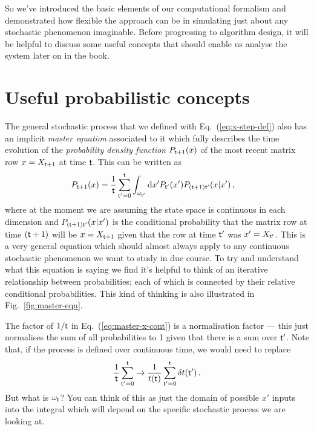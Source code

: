 \documentclass{book}
\begin{document}
So we've introduced the basic elements of our computational formalism and demonstrated how flexible the approach can be in simulating just about any stochastic phenomenon imaginable. Before progressing to algorithm design, it will be helpful to discuss some useful concepts that should enable us analyse the system later on in the book.

\section{\sffamily Useful probabilistic concepts}

The general stochastic process that we defined with Eq.~(\ref{eq:x-step-def}) also has an implicit \emph{master equation} associated to it which fully describes the time evolution of the \emph{probability density function} $P_{{\sf t}+1}(x)$ of the most recent matrix row $x=X_{{\sf t}+1}$ at time ${\sf t}$. This can be written as
\begin{align}
P_{{\sf t}+1}(x) &= \frac{1}{{\sf t}}\sum_{{\sf t}'=0}^{{\sf t}}\int_{\omega_{{\sf t}'}}{\rm d}x' P_{{\sf t}'}(x') P_{({\sf t}+1){\sf t}'}(x\vert x') \label{eq:master-x-cont} \,,
\end{align}
where at the moment we are assuming the state space is continuous in each dimension and $P_{({\sf t}+1){\sf t}'}(x\vert x')$ is the conditional probability that the matrix row at time $({\sf t}+1)$ will be $x=X_{{\sf t}+1}$ given that the row at time ${\sf t}'$ was $x'=X_{{\sf t}'}$. This is a very general equation which should almost always apply to any continuous stochastic phenomenon we want to study in due course. To try and understand what this equation is saying we find it's helpful to think of an iterative relationship between probabilities; each of which is connected by their relative conditional probabilities. This kind of thinking is also illustrated in Fig.~\ref{fig:master-eqn}.

The factor of $1/{\sf t}$ in Eq.~(\ref{eq:master-x-cont}) is a normalisation factor --- this just normalises the sum of all probabilities to 1 given that there is a sum over ${\sf t}'$. Note that, if the process is defined over continuous time, we would need to replace 
\begin{align}
\frac{1}{{\sf t}}\sum_{{\sf t}'=0}^{{\sf t}} \rightarrow \frac{1}{t({\sf t})}\sum_{{\sf t}'=0}^{{\sf t}}\delta t({\sf t}') \,.
\end{align}
But what is $\omega_{\sf t}$? You can think of this as just the domain of possible $x'$ inputs into the integral which will depend on the specific stochastic process we are looking at.
\end{document}
